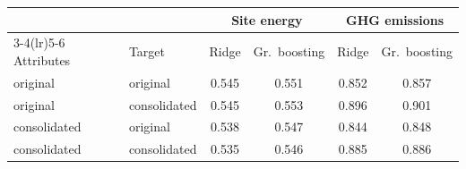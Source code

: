 \begin{tabular}{llcccc}
\toprule
 & & \multicolumn{2}{c}{Site energy} & \multicolumn{2}{c}{GHG emissions} \\
\cmidrule(lr){3-4}\cmidrule(lr){5-6}
Attributes & Target & Ridge & Gr.\ boosting & Ridge & Gr.\ boosting \\
\midrule
original & original & 0.545 & 0.551 & 0.852 & 0.857 \\
original & consolidated & 0.545 & 0.553 & 0.896 & 0.901 \\
consolidated & original & 0.538 & 0.547 & 0.844 & 0.848 \\
consolidated & consolidated & 0.535 & 0.546 & 0.885 & 0.886 \\
\bottomrule
\end{tabular}
